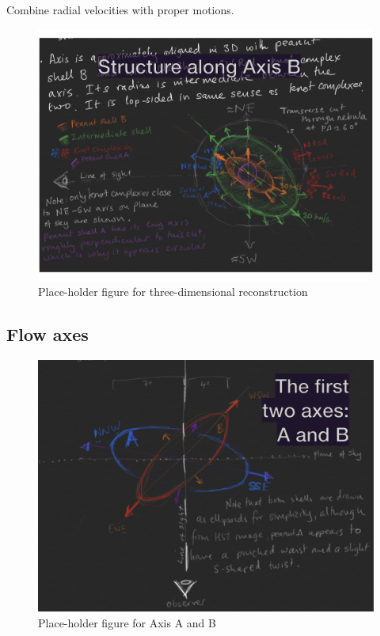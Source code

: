 \documentclass[useAMS, usenatbib]{mnras}
\begin{document}
Combine radial velocities with proper motions.

\begin{figure}
  \includegraphics[width=\linewidth]
  {talk-figs/turtle-talk-morelia-2020-02-export-011}
  \caption{Place-holder figure for three-dimensional reconstruction}
  \label{fig:axis-B-3d}
\end{figure}

\subsection{Flow axes}
\label{sec:flow-axes}

\begin{figure}
  \includegraphics[width=\linewidth]
  {talk-figs/turtle-talk-morelia-2020-02-export-010}
  \caption{Place-holder figure for Axis A and B}
  \label{fig:flow-axes-AB}
\end{figure}
\end{document}
